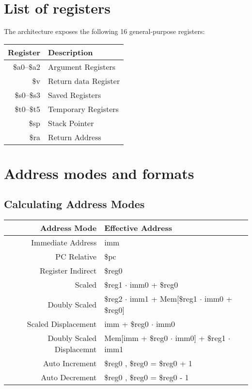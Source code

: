\documentclass[12pt]{article}
\begin{document}
\section{List of registers}
The architecture exposes the following 16 general-purpose registers:

\vspace{6pt}
\begin{tabular}{| r | l |}
\hline
\textbf{Register} & \textbf{Description}\\
\hline
\$a0--\$a2 & Argument Registers\\
\$v & Return data Register\\
\$s0--\$s3 & Saved Registers\\
\$t0--\$t5 & Temporary Registers\\
\$sp & Stack Pointer\\
\$ra & Return Address\\ 
\hline
\end {tabular}

\section{Address modes and formats}
\subsection{Calculating Address Modes}
\begin{tabular}{| r | l |}
\hline
\textbf{Address Mode} & \textbf {Effective Address} \\
\hline
Immediate Address & imm\\
PC Relative & \$pc \\
Register Indirect & \$reg0\\
Scaled & \$reg1 $\cdot$ imm0 + \$reg0\\
Doubly Scaled & \$reg2 $\cdot$ imm1 + Mem[\$reg1 $\cdot$ imm0 + \$reg0]\\
Scaled Displacement & imm + \$reg0 $\cdot$ imm0\\
Doubly Scaled Displacemnt & Mem[imm + \$reg0 $\cdot$ imm0] + \$reg1 $\cdot$ imm1\\
Auto Increment & \$reg0 , \$reg0 = \$reg0 + 1\\
Auto Decrement & \$reg0 , \$reg0 = \$reg0 - 1\\
\hline
\end{tabular}
\end{document}
